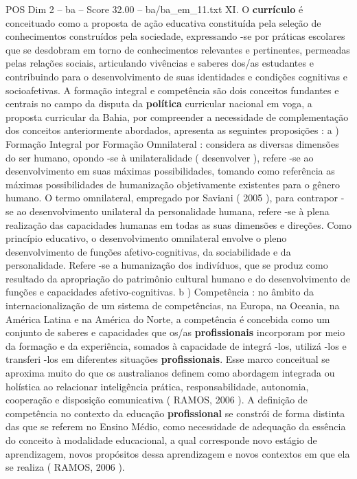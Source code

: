 \begin{textsample}{POS Dim 2 – ba – Score 32.00 – ba/ba\_em\_11.txt}
XI.
O \textbf{currículo} é conceituado como a proposta de ação educativa constituída pela seleção de conhecimentos construídos pela sociedade, expressando -se por práticas escolares que se desdobram em torno de conhecimentos relevantes e pertinentes, permeadas pelas relações sociais, articulando vivências e saberes dos/as estudantes e contribuindo para o desenvolvimento de suas identidades e condições cognitivas e socioafetivas.
A formação integral e competência são dois conceitos fundantes e centrais no campo da disputa da \textbf{política} curricular nacional em voga, a proposta curricular da Bahia, por compreender a necessidade de complementação dos conceitos anteriormente abordados, apresenta as seguintes proposições : a ) Formação Integral por Formação Omnilateral : considera as diversas dimensões do ser humano, opondo -se à unilateralidade ( desenvolver ), refere -se ao desenvolvimento em suas máximas possibilidades, tomando como referência as máximas possibilidades de humanização objetivamente existentes para o gênero humano.
O termo omnilateral, empregado por Saviani ( 2005 ), para contrapor -se ao desenvolvimento unilateral da personalidade humana, refere -se à plena realização das capacidades humanas em todas as suas dimensões e direções.
Como princípio educativo, o desenvolvimento omnilateral envolve o pleno desenvolvimento de funções afetivo-cognitivas, da sociabilidade e da personalidade.
Refere -se a humanização dos indivíduos, que se produz como resultado da apropriação do patrimônio cultural humano e do desenvolvimento de funções e capacidades afetivo-cognitivas. b ) Competência : no âmbito da internacionalização de um sistema de competências, na Europa, na Oceania, na América Latina e na América do Norte, a competência é concebida como um conjunto de saberes e capacidades que os/as \textbf{profissionais} incorporam por meio da formação e da experiência, somados à capacidade de integrá -los, utilizá -los e transferi -los em diferentes situações \textbf{profissionais}.
Esse marco conceitual se aproxima muito do que os australianos definem como abordagem integrada ou holística ao relacionar inteligência prática, responsabilidade, autonomia, cooperação e disposição comunicativa ( RAMOS, 2006 ).
A definição de competência no contexto da educação \textbf{profissional} se constrói de forma distinta das que se referem no Ensino Médio, como necessidade de adequação da essência do conceito à modalidade educacional, a qual corresponde novo estágio de aprendizagem, novos propósitos dessa aprendizagem e novos contextos em que ela se realiza ( RAMOS, 2006 ).

\end{textsample}
